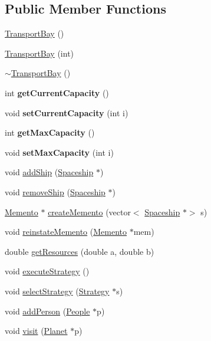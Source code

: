 \subsection*{Public Member Functions}
\begin{DoxyCompactItemize}
\item 
\hyperlink{classTransportBay_a878d1695b58a12ccd698a85f9e01ffb6}{Transport\+Bay} ()
\item 
\hyperlink{classTransportBay_a731f9665c1fb62d3c533f1323a8742de}{Transport\+Bay} (int)
\item 
\hyperlink{classTransportBay_a14dad2eb1e9cb83bb85de4574c2bcbb2}{$\sim$\+Transport\+Bay} ()
\item 
\mbox{\label{classTransportBay_a3e28498ac79aaf21921c1d03917ef390}} 
int {\bfseries get\+Current\+Capacity} ()
\item 
\mbox{\label{classTransportBay_ab8736f17ce87955d9a60adc5a17fec09}} 
void {\bfseries set\+Current\+Capacity} (int i)
\item 
\mbox{\label{classTransportBay_a4d19bec72afdf29f7bb693610e62759c}} 
int {\bfseries get\+Max\+Capacity} ()
\item 
\mbox{\label{classTransportBay_ab3d6bcacbf6d0a407774e16e28655009}} 
void {\bfseries set\+Max\+Capacity} (int i)
\item 
void \hyperlink{classTransportBay_acd6b5b09e81bd28c6dcbe23d561fd99c}{add\+Ship} (\hyperlink{classSpaceship}{Spaceship} $\ast$)
\item 
void \hyperlink{classTransportBay_a053ab5bbf5b6cafe1f5b3782176bd214}{remove\+Ship} (\hyperlink{classSpaceship}{Spaceship} $\ast$)
\item 
\hyperlink{classMemento}{Memento} $\ast$ \hyperlink{classTransportBay_aff9390fd8b7434bfa03b408028caf920}{create\+Memento} (vector$<$ \hyperlink{classSpaceship}{Spaceship} $\ast$$>$ s)
\item 
void \hyperlink{classTransportBay_a501256401b6845a16ced9ea65c294f70}{reinstate\+Memento} (\hyperlink{classMemento}{Memento} $\ast$mem)
\item 
double \hyperlink{classTransportBay_afac369115f4c17522a123f36be183e29}{get\+Resources} (double a, double b)
\item 
void \hyperlink{classTransportBay_a04aea7cba776cb1a8fd40f40cc6f495c}{execute\+Strategy} ()
\item 
void \hyperlink{classTransportBay_a277ec0488bbafbeef8d25a77dc5576c8}{select\+Strategy} (\hyperlink{classStrategy}{Strategy} $\ast$s)
\item 
void \hyperlink{classTransportBay_a2be08f6085583ec9f839ff8939c6a6b7}{add\+Person} (\hyperlink{classPeople}{People} $\ast$p)
\item 
void \hyperlink{classTransportBay_a01efe0f6bd015b1ae194e111e5589444}{visit} (\hyperlink{classPlanet}{Planet} $\ast$p)
\end{DoxyCompactItemize}
